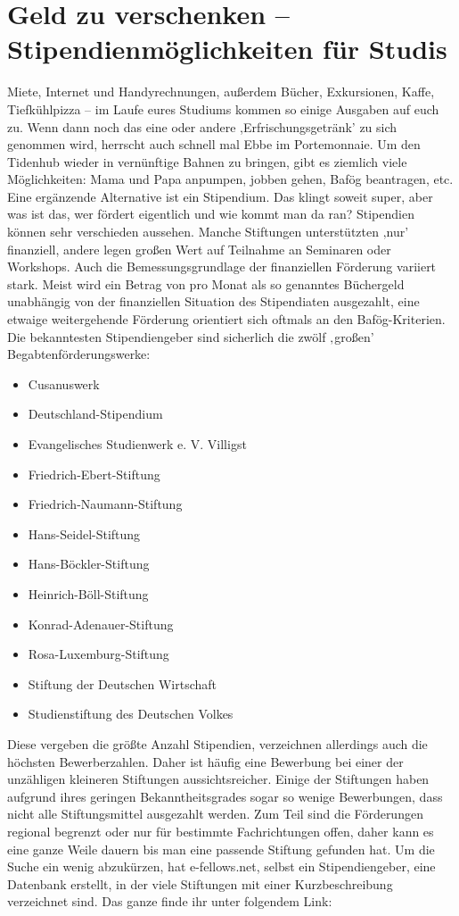 \section{Geld zu verschenken – Stipendienmöglichkeiten für Studis}
Miete, Internet und Handyrechnungen, außerdem Bücher, Exkursionen, Kaffe, Tiefkühlpizza – im Laufe eures Studiums kommen so einige Ausgaben auf euch zu. Wenn dann noch das eine oder andere ,Erfrischungsgetränk' zu sich genommen wird, herrscht auch schnell mal Ebbe im Portemonnaie. Um den Tidenhub wieder in vernünftige Bahnen zu bringen, gibt es ziemlich viele Möglichkeiten: Mama und Papa anpumpen, jobben gehen, Bafög beantragen, etc. Eine ergänzende Alternative ist ein Stipendium. Das klingt soweit super, aber was ist das, wer fördert eigentlich und wie kommt man da ran?
Stipendien können sehr verschieden aussehen. Manche Stiftungen unterstützten ‚nur’ finanziell, andere legen großen Wert auf Teilnahme an Seminaren oder Workshops. Auch die Bemessungsgrundlage der finanziellen Förderung variiert stark. Meist wird ein Betrag von \unit[60-100]{\officialeuro} pro Monat als so genanntes Büchergeld unabhängig von der finanziellen Situation des Stipendiaten ausgezahlt, eine etwaige weitergehende Förderung orientiert sich oftmals an den Bafög-Kriterien.
Die bekanntesten Stipendiengeber sind sicherlich die zwölf ‚großen’ Begabtenförderungswerke:
\begin{itemize}
 \item Cusanuswerk
 \item Deutschland-Stipendium
 \item Evangelisches Studienwerk e. V. Villigst
 \item Friedrich-Ebert-Stiftung
 \item Friedrich-Naumann-Stiftung
 \item Hans-Seidel-Stiftung
 \item Hans-Böckler-Stiftung
 \item Heinrich-Böll-Stiftung
 \item Konrad-Adenauer-Stiftung
 \item Rosa-Luxemburg-Stiftung
 \item Stiftung der Deutschen Wirtschaft
 \item Studienstiftung des Deutschen Volkes 
\end{itemize}
Diese vergeben die größte Anzahl Stipendien, verzeichnen allerdings auch die höchsten Bewerberzahlen. Daher ist häufig eine Bewerbung bei einer der unzähligen kleineren Stiftungen aussichtsreicher. Einige der Stiftungen haben aufgrund ihres geringen Bekanntheitsgrades sogar so wenige Bewerbungen, dass nicht alle Stiftungsmittel ausgezahlt werden. Zum Teil sind die Förderungen regional begrenzt oder nur für bestimmte Fachrichtungen offen, daher kann es eine ganze Weile dauern bis man eine passende Stiftung gefunden hat. Um die Suche ein wenig abzukürzen, hat e-fellows.net, selbst ein Stipendiengeber, eine Datenbank erstellt, in der viele Stiftungen mit einer Kurzbeschreibung verzeichnet sind. Das ganze finde ihr unter folgendem Link:\\ 
